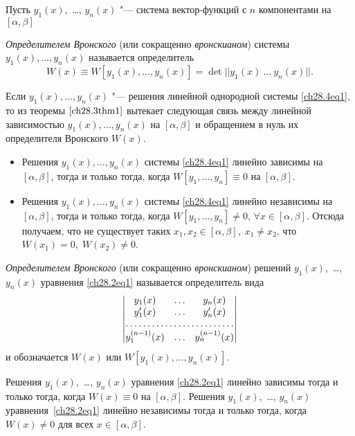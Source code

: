 Пусть $y_1(x)$,~\dots, $y_n(x)$ "--- система вектор-функций с $n$ компонентами на $[\alpha, \beta]$
\begin{defn}
\textit{Определителем Вронского} (или сокращенно \textit{вронскианом}) системы $y_1(x), \ldots, y_n(x)$ называется определитель
$$
W(x) \equiv W[y_1(x), \ldots, y_n(x)] = \det ||y_1(x)\ \ldots\ y_n(x)||.
$$

Если $y_1(x), \ldots, y_n(x)$ "--- решения линейной однородной системы \eqref{ch28.4eq1}, то из теоремы $\ref{ch28.3thm1}$ вытекает следующая связь между линейной зависимостью $y_1(x), \ldots, y_n(x)$ на $[\alpha, \beta]$ и обращением в нуль их определителя Вронского $W(x)$.

\begin{itemize}
\item
Решения $y_1(x), \ldots, y_n(x)$ системы \eqref{ch28.4eq1} линейно зависимы на $[\alpha, \beta]$, тогда и только тогда, когда $W[y_1, \ldots, y_n] \equiv 0$ на $[\alpha, \beta]$.
\item
Решения $y_1(x), \ldots, y_n(x)$ системы \eqref{ch28.4eq1} линейно независимы на $[\alpha, \beta]$, тогда и только тогда, когда $W[y_1, \ldots, y_n] \not = 0$, $\forall x \in [\alpha, \beta]$. Отсюда получаем, что не существует таких $x_1, x_2 \in [\alpha, \beta], \; x_1 \not= x_2$, что $W(x_1) = 0, \; W(x_2) \not= 0$. 
\end{itemize}
\end{defn}

\begin{defn}
\textit{Определителем Вронского} (или сокращенно \textit{вронскианом}) решений $y_1(x)$,~\ldots, $y_n(x)$ уравнения \eqref{ch28.2eq1} называется определитель вида
\begin{equation}
\begin{vmatrix}
y_1(x) & \ldots & y_n(x) \\
y'_1(x) & \ldots & y'_n(x) \\
\hdotsfor{3} \\
y^{(n - 1)}_1(x) & \ldots & y^{(n - 1)}_n(x)
\end{vmatrix}
\end{equation}
и обозначается $W(x)$ или $W[y_1(x), \ldots, y_n(x)]$.
\end{defn}

\begin{thm} \label{ch28.3thm3}
Решения $y_1(x)$,~\ldots, $y_n(x)$ уравнения \eqref{ch28.2eq1} линейно зависимы тогда и только тогда, когда $W(x) \equiv 0$ на $[\alpha, \beta]$. Решения $y_1(x)$,~\ldots, $y_n(x)$ уравнения~\eqref{ch28.2eq1} линейно независимы тогда и только тогда, когда $W(x) \not= 0$ для всех $x \in [\alpha, \beta]$.
\end{thm}

